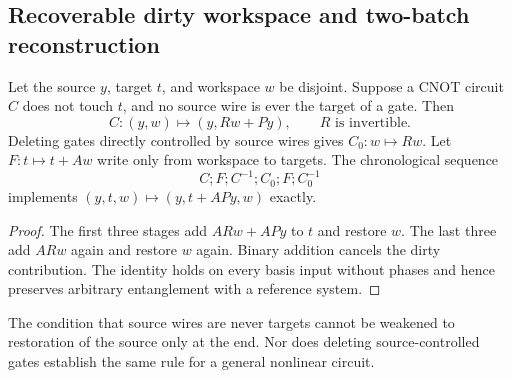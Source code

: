 \subsection{Recoverable dirty workspace and two-batch reconstruction}
\begin{lemma}\label{lem:echo}
Let the source $y$, target $t$, and workspace $w$ be disjoint. Suppose a CNOT circuit $C$ does not touch $t$, and no source wire is ever the target of a gate. Then
\[
C:(y,w)\mapsto(y,Rw+Py),\qquad R\text{ is invertible}.
\]
Deleting gates directly controlled by source wires gives $C_0:w\mapsto Rw$. Let $F:t\mapsto t+Aw$ write only from workspace to targets. The chronological sequence
\begin{equation}\label{eq:echo}
C;F;C^{-1};C_0;F;C_0^{-1}
\end{equation}
implements $(y,t,w)\mapsto(y,t+APy,w)$ exactly.
\end{lemma}
\begin{proof}
The first three stages add $ARw+APy$ to $t$ and restore $w$. The last three add $ARw$ again and restore $w$ again. Binary addition cancels the dirty contribution. The identity holds on every basis input without phases and hence preserves arbitrary entanglement with a reference system.
\end{proof}
The condition that source wires are never targets cannot be weakened to restoration of the source only at the end. Nor does deleting source-controlled gates establish the same rule for a general nonlinear circuit.

